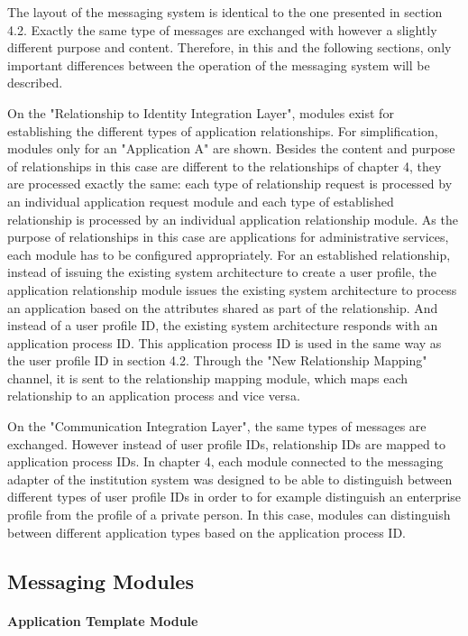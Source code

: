 The layout of the messaging system is identical to the one presented in section 4.2. Exactly the same type of messages are exchanged with however a slightly different purpose and content. Therefore, in this and the following sections, only important differences between the operation of the messaging system will be described.

On the "Relationship to Identity Integration Layer", modules exist for establishing the different types of application relationships. For simplification, modules only for an "Application A" are shown. Besides the content and purpose of relationships in this case are different to the relationships of chapter 4, they are processed exactly the same: each type of relationship request is processed by an individual application request module and each type of established relationship is processed by an individual application relationship module. As the purpose of relationships in this case are applications for administrative services, each module has to be configured appropriately. For an established relationship, instead of issuing the existing system architecture to create a user profile, the application relationship module issues the existing system architecture to process an application based on the attributes shared as part of the relationship. And instead of a user profile ID, the existing system architecture responds with an application process ID. This application process ID is used in the same way as the user profile ID in section 4.2. Through the "New Relationship Mapping" channel, it is sent to the relationship mapping module, which maps each relationship to an application process and vice versa.

On the "Communication Integration Layer", the same types of messages are exchanged. However instead of user profile IDs, relationship IDs are mapped to application process IDs. In chapter 4, each module connected to the messaging adapter of the institution system was designed to be able to distinguish between different types of user profile IDs in order to for example distinguish an enterprise profile from the profile of a private person. In this case, modules can distinguish between different application types based on the application process ID.

\subsection{Messaging Modules}

\paragraph{Application Template Module}

